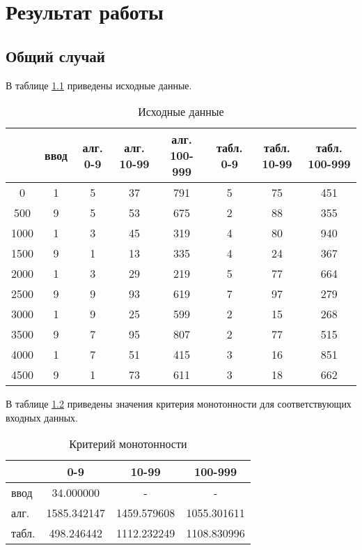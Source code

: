 \chapter{Результат работы}

\section{Общий случай}

В таблице \ref{tbl:data1} приведены исходные данные.

\begin{table}[ht]
	\begin{center}
		\caption{Исходные данные}
		\small
		\label{tbl:data1}
        \begin{tabular}{|c|c|c|c|c|c|c|c|}
        \hline
        {} & ввод & алг. 0-9 &  алг. 10-99 &  алг. 100-999 &  табл. 0-9 &  табл. 10-99 &  табл. 100-999 \\
        \hline
        0    & 1 & 5 & 37 & 791 & 5 & 75 & 451 \\
        500  & 9 & 5 & 53 & 675 & 2 & 88 & 355 \\
        1000 & 1 & 3 & 45 & 319 & 4 & 80 & 940 \\
        1500 & 9 & 1 & 13 & 335 & 4 & 24 & 367 \\
        2000 & 1 & 3 & 29 & 219 & 5 & 77 & 664 \\
        2500 & 9 & 9 & 93 & 619 & 7 & 97 & 279 \\
        3000 & 1 & 9 & 25 & 599 & 2 & 15 & 268 \\
        3500 & 9 & 7 & 95 & 807 & 2 & 77 & 515 \\
        4000 & 1 & 7 & 51 & 415 & 3 & 16 & 851 \\
        4500 & 9 & 1 & 73 & 611 & 3 & 18 & 662 \\
        \hline
        \end{tabular}
	\end{center}
\end{table}

В таблице \ref{tbl:mono1} приведены значения критерия монотонности для соответствующих входных данных.

\begin{table}[ht]
	\begin{center}
		\caption{Критерий монотонности}
		\small
		\label{tbl:mono1}
            \begin{tabular}{|l|c|c|c|}
         	 \hline
            {}    & 0-9 & 10-99 & 100-999 \\
            \hline
            ввод  & 34.000000 & - & - \\
            алг.  & 1585.342147 & 1459.579608 &  1055.301611 \\
            табл. & 498.246442 & 1112.232249 &  1108.830996 \\
			 \hline
        \end{tabular}
	\end{center}
\end{table}

